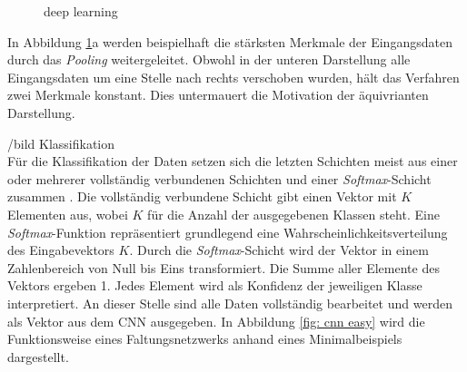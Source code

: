 \begin{figure}[H]
			\caption{deep learning}
			\label{fig: Pooling}
		\end{figure}
		
		In Abbildung \ref{fig: Pooling}a werden beispielhaft die stärksten Merkmale der Eingangsdaten durch das \textit{Pooling} weitergeleitet. Obwohl in der unteren Darstellung alle Eingangsdaten um eine Stelle nach rechts verschoben wurden, hält das Verfahren zwei Merkmale konstant. Dies untermauert die Motivation der äquivrianten Darstellung.
		
		/bild Klassifikation\\
		
		Für die Klassifikation der Daten setzen sich die letzten Schichten meist aus einer oder mehrerer vollständig verbundenen Schichten und einer \textit{Softmax}-Schicht zusammen \cite{deeplearning}. Die vollständig verbundene Schicht gibt einen Vektor mit $K$ Elementen aus, wobei $K$ für die Anzahl der ausgegebenen Klassen steht. Eine \textit{Softmax}-Funktion repräsentiert grundlegend eine Wahrscheinlichkeitsverteilung des Eingabevektors $K$. Durch die \textit{Softmax}-Schicht wird der Vektor in einem Zahlenbereich von Null bis Eins transformiert. Die Summe aller Elemente des Vektors ergeben 1. Jedes Element wird als Konfidenz der jeweiligen Klasse interpretiert. An dieser Stelle sind alle Daten vollständig bearbeitet und werden als Vektor aus dem CNN ausgegeben. In Abbildung \ref{fig: cnn easy} wird die Funktionsweise eines Faltungsnetzwerks anhand eines Minimalbeispiels dargestellt.\\
		
